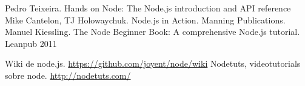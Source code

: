 
\begin{thebibliography}{9}

  Pedro Teixeira. Hands on Node: The Node.js introduction and API reference
  Mike Cantelon, TJ Holowaychuk. Node.js in Action. Manning Publications.
 Manuel Kiessling. The Node Beginner Book: A comprehensive Node.js tutorial. Leanpub 2011 

 Wiki de node.js. \url{https://github.com/joyent/node/wiki}
 Nodetuts, videotutorials sobre node. \url{http://nodetuts.com/}

\end{thebibliography}
